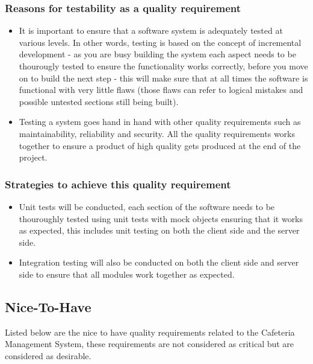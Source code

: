 \documentclass[a4paper,12pt]{article}
\begin{document}
\subsubsection{Reasons for testability as a quality requirement}
\begin{itemize}
\item  It is important to ensure that a software system is adequately tested at various levels. In other words, testing is based on the 
concept of incremental development - as you are busy building the system each aspect needs to be thourougly tested to ensure the functionality works correctly, before you move on to build the next step - this will make sure that at all times the software is functional with very little flaws (those flaws can refer to logical mistakes and possible untested sections still being built).
\item Testing a system goes hand in hand with other quality requirements such as maintainability, reliability and security. All the quality requirements works together to ensure a product of high quality gets produced at the end of the project.
\end{itemize}

\subsubsection{Strategies to achieve this quality requirement}
\begin{itemize}
\item Unit tests will be conducted, each section of the software needs to be thouroughly tested using unit tests with mock objects ensuring that it works as expected, this includes unit testing on both the client side and the server side.
\item Integration testing will also be conducted on both the client side and server side to ensure that all modules work together as expected.
\end{itemize}


\subsection{Nice-To-Have}
Listed below are the nice to have quality requirements related to the Cafeteria Management System, these requirements are not considered as critical but are considered as desirable. \\
\end{document}

